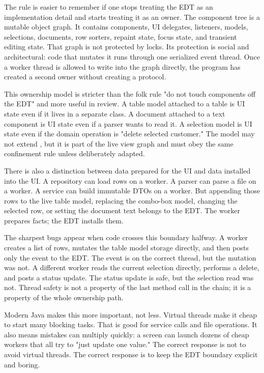 The rule is easier to remember if one stops treating the EDT as an implementation detail and starts treating it as an owner. The component tree is a mutable object graph. It contains components, UI delegates, listeners, models, selections, documents, row sorters, repaint state, focus state, and transient editing state. That graph is not protected by locks. Its protection is social and architectural: code that mutates it runs through one serialized event thread. Once a worker thread is allowed to write into the graph directly, the program has created a second owner without creating a protocol.

This ownership model is stricter than the folk rule "do not touch components off the EDT" and more useful in review. A table model attached to a table is UI state even if it lives in a separate class. A document attached to a text component is UI state even if a parser wants to read it. A selection model is UI state even if the domain operation is "delete selected customer." The model may not extend , but it is part of the live view graph and must obey the same confinement rule unless deliberately adapted.

There is also a distinction between data prepared for the UI and data installed into the UI. A repository can load rows on a worker. A parser can parse a file on a worker. A service can build immutable DTOs on a worker. But appending those rows to the live table model, replacing the combo-box model, changing the selected row, or setting the document text belongs to the EDT. The worker prepares facts; the EDT installs them.

The sharpest bugs appear when code crosses this boundary halfway. A worker creates a list of rows, mutates the table model storage directly, and then posts only the event to the EDT. The event is on the correct thread, but the mutation was not. A different worker reads the current selection directly, performs a delete, and posts a status update. The status update is safe, but the selection read was not. Thread safety is not a property of the last method call in the chain; it is a property of the whole ownership path.

Modern Java makes this more important, not less. Virtual threads make it cheap to start many blocking tasks. That is good for service calls and file operations. It also means mistakes can multiply quickly: a screen can launch dozens of cheap workers that all try to "just update one value." The correct response is not to avoid virtual threads. The correct response is to keep the EDT boundary explicit and boring.

